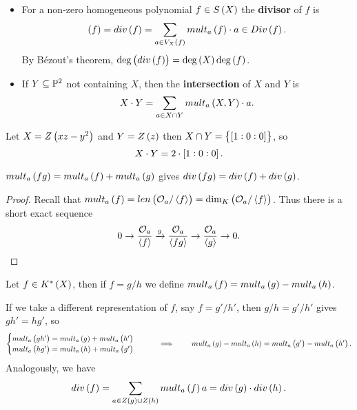 \pagebreak

\begin{definition}
\hfill
\begin{itemize}
\item For a non-zero homogeneous polynomial $ f \in S\br{X} $ the \textbf{divisor} of $ f $ is
$$ \br{f} = div\br{f} = \sum_{a \in V_X\br{f}} mult_a\br{f} \cdot a \in Div\br{f}. $$
By B\'ezout's theorem, $ \deg\br{div\br{f}} = \deg\br{X}\deg\br{f} $.
\item If $ Y \subseteq \P^2 $ not containing $ X $, then the \textbf{intersection} of $ X $ and $ Y $ is
$$ X \cdot Y = \sum_{a \in X \cap Y} mult_a\br{X, Y} \cdot a. $$
\end{itemize}
\end{definition}

\begin{example}
Let $ X = Z\br{xz - y^2} $ and $ Y = Z\br{z} $ then $ X \cap Y = \cbr{\sbr{1 : 0 : 0}} $, so
$$ X \cdot Y = 2 \cdot \sbr{1 : 0 : 0}. $$
\end{example}

\begin{lemma}
$ mult_a\br{fg} = mult_a\br{f} + mult_a\br{g} $ gives $ div\br{fg} = div\br{f} + div\br{g} $.
\end{lemma}

\begin{proof}
Recall that $ mult_a\br{f} = len\br{\OO_a / \abr{f}} = \dim_K\br{\OO_a / \abr{f}} $. Thus there is a short exact sequence
$$ 0 \to \dfrac{\OO_a}{\abr{f}} \xrightarrow{g} \dfrac{\OO_a}{\abr{fg}} \to \dfrac{\OO_a}{\abr{g}} \to 0. $$
\end{proof}

\begin{definition}
Let $ f \in K^*\br{X} $, then if $ f = g / h $ we define $ mult_a\br{f} = mult_a\br{g} - mult_a\br{h} $.
\end{definition}

If we take a different representation of $ f $, say $ f = g' / h' $, then $ g / h = g' / h' $ gives $ gh' = hg' $, so
$$
\begin{cases}
mult_a\br{gh'} = mult_a\br{g} + mult_a\br{h'} \\
mult_a\br{hg'} = mult_a\br{h} + mult_a\br{g'}
\end{cases}
\qquad \implies \qquad mult_a\br{g} - mult_a\br{h} = mult_a\br{g'} - mult_a\br{h'}. $$
Analogously, we have
$$ div\br{f} = \sum_{a \in Z\br{g} \cup Z\br{h}} mult_a\br{f}a = div\br{g} \cdot div\br{h}. $$

